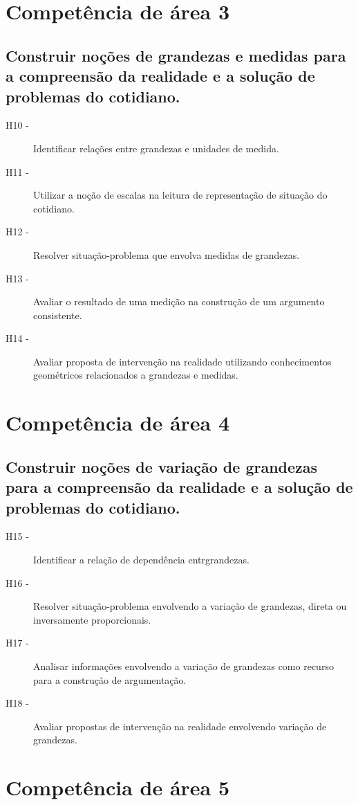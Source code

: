 \section*{Competência de área 3}
    \subsection*{Construir noções de grandezas e medidas para a compreensão da realidade
    	e a solução de problemas do cotidiano.}
    	\begin{description}
    		\item [H10 -]Identificar relações entre grandezas e unidades de medida.
    		\item [H11 -]Utilizar a noção de escalas na leitura de representação de situação do cotidiano.
    		\item [H12 -]Resolver situação-problema que envolva medidas de grandezas.
    		\item [H13 -]Avaliar o resultado de uma medição na construção de um argumento consistente.
    		\item [H14 -]Avaliar proposta de intervenção na realidade utilizando conhecimentos geométricos relacionados a grandezas e medidas.
    	\end{description}

\section*{Competência de área 4}
    \subsection*{Construir noções de variação de grandezas para a compreensão da realidade
    	e a solução de problemas do cotidiano.}
    	\begin{description}
    		\item [H15 -]Identificar a relação de dependência entrgrandezas.
    		\item [H16 -]Resolver situação-problema envolvendo a variação de grandezas, direta ou inversamente proporcionais.
    		\item [H17 -]Analisar informações envolvendo a variação de grandezas como recurso para a construção de argumentação.
    		\item [H18 -]Avaliar propostas de intervenção na realidade envolvendo variação de grandezas.
    	\end{description}

\section*{Competência de área 5}
